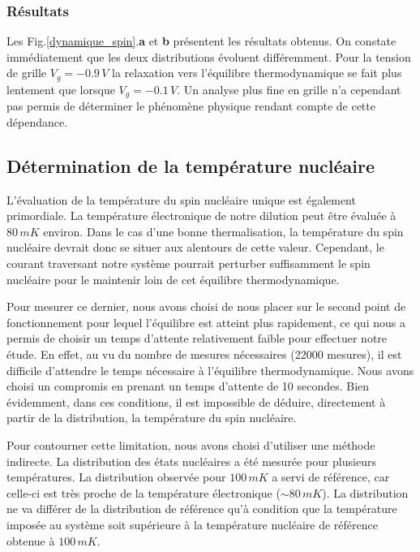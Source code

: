 \subsubsection{Résultats}
Les Fig.\ref{dynamique_spin}.\textbf{a} et \textbf{b} présentent les résultats obtenus. On constate immédiatement que les deux distributions évoluent différemment. Pour la tension de grille $V_g = -0.9\,V$ la relaxation vers l'équilibre thermodynamique se fait plus lentement que lorsque $V_g = -0.1\,V$. Un analyse plus fine en grille n'a cependant pas permis de déterminer le phénomène physique rendant compte de cette dépendance.

\subsection{Détermination de la température nucléaire}
L'évaluation de la température du spin nucléaire unique est également primordiale. La température électronique de notre dilution peut \^etre évaluée à $80\,mK$ environ. Dans le cas d'une bonne thermalisation, la température du spin nucléaire devrait donc se situer aux alentours de cette valeur. Cependant, le courant traversant notre système pourrait perturber suffisamment le spin nucléaire pour le maintenir loin de cet équilibre thermodynamique. 

Pour mesurer ce dernier, nous avons choisi de nous placer sur le second point de fonctionnement pour lequel l'équilibre est atteint plus rapidement, ce qui nous  a permis de choisir un temps d'attente relativement faible pour effectuer notre étude. En effet, au vu du nombre de mesures nécessaires (22000 mesures), il est difficile d'attendre le temps nécessaire à l'équilibre thermodynamique. Nous avons choisi un compromis en prenant un temps d'attente de 10 secondes. Bien évidemment, dans ces conditions, il est impossible de déduire, directement à partir de la distribution, la température du spin nucléaire.

Pour contourner cette limitation, nous avons choisi d'utiliser une méthode indirecte. La distribution des états nucléaires a été mesurée pour plusieurs températures. La distribution observée pour $100\,mK$ a servi de référence, car celle-ci est très proche de la température électronique ($\sim 80\,mK$). La distribution ne va différer de la distribution de référence qu'à condition que la température imposée au système soit supérieure à la température nucléaire de référence obtenue à $100\,mK$.

